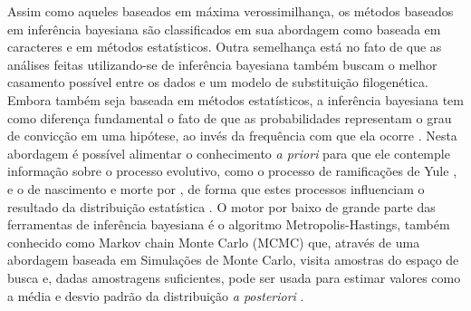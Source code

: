 \documentclass[english,brazilian]{UNISINOSmonografia} %
\begin{document}
Assim como aqueles baseados em máxima verossimilhança, os métodos baseados em inferência bayesiana são classificados em sua abordagem como baseada em caracteres e em métodos estatísticos.
Outra semelhança está no fato de que as análises feitas utilizando-se de inferência bayesiana também buscam o melhor casamento possível entre os dados e um modelo de substituição filogenética.
Embora também seja baseada em métodos estatísticos, a inferência bayesiana tem como diferença fundamental o fato de que as probabilidades representam o grau de convicção em uma hipótese, ao invés da frequência com que ela ocorre \cite{Keane2006a}.
Nesta abordagem é possível alimentar o conhecimento \textit{a priori} para que ele contemple informação sobre o processo evolutivo, como o processo de ramificações de Yule \cite{Edwards1970}, e o de nascimento e morte por , de forma que estes processos influenciam o resultado da distribuição estatística \cite{yang2014molecular}.
O motor por baixo de grande parte das ferramentas de inferência bayesiana é o 
algoritmo Metropolis-Hastings, também conhecido como Markov chain Monte Carlo (MCMC) que, através de uma abordagem baseada em Simulações de Monte Carlo, visita amostras do espaço de busca e, dadas amostragens suficientes, pode ser usada para estimar valores como a média e desvio padrão da distribuição \textit{a posteriori} \cite{Nascimento2017}.


\end{document}
